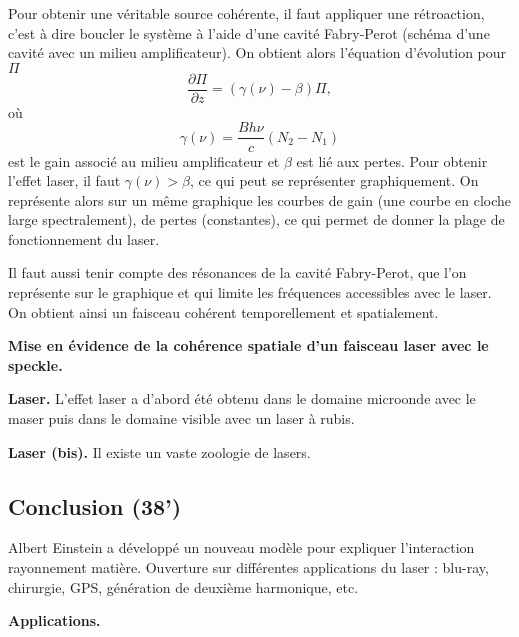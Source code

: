 Pour obtenir une véritable source cohérente, il faut appliquer une rétroaction, c'est à dire boucler le système à l'aide d'une cavité Fabry-Perot (schéma d'une cavité avec un milieu amplificateur).
On obtient alors l'équation d'évolution pour $\Pi$
\begin{equation}
\frac{\partial \Pi}{\partial z} = (\gamma(\nu) - \beta ) \Pi,
\end{equation}
où
\begin{equation}
\gamma(\nu) = \frac{Bh\nu}{c}(N_2-N_1)
\end{equation}
est le gain associé au milieu amplificateur et $\beta$ est lié aux pertes.
Pour obtenir l'effet laser, il faut $\gamma(\nu) > \beta$, ce qui peut se représenter graphiquement.
On représente alors sur un même graphique les courbes de gain (une courbe en cloche large spectralement), de pertes (constantes), ce qui permet de donner la plage de fonctionnement du laser.

Il faut aussi tenir compte des résonances de la cavité Fabry-Perot, que l'on représente sur le graphique et qui limite les fréquences accessibles avec le laser.
On obtient ainsi un faisceau cohérent temporellement et spatialement.

\begin{experience}
\textbf{Mise en évidence de la cohérence spatiale d'un faisceau laser avec le speckle.}
\end{experience}

\begin{slide}
\textbf{Laser.}
L'effet laser a d'abord été obtenu dans le domaine microonde avec le maser puis dans le domaine visible avec un laser à rubis.
\end{slide}

\begin{slide}
\textbf{Laser (bis).}
Il existe un vaste zoologie de lasers.
\end{slide}

\subsection{Conclusion (38')}

Albert Einstein a développé un nouveau modèle pour expliquer l'interaction rayonnement matière.
Ouverture sur différentes applications du laser : blu-ray, chirurgie, GPS, génération de deuxième harmonique, etc.

\begin{slide}
\textbf{Applications.}
\end{slide}